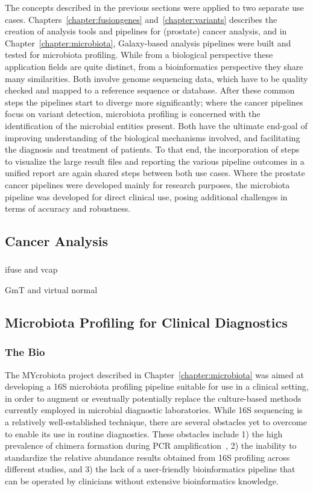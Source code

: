The concepts described in the previous sections were applied to two separate use cases. Chapters~\ref{chapter:fusiongenes} and~\ref{chapter:variants} describes the creation of analysis tools and pipelines for (prostate) cancer analysis, and in Chapter~\ref{chapter:microbiota}, Galaxy-based analysis pipelines were built and tested for microbiota profiling. While from a biological perspective these application fields are quite distinct, from a bioinformatics perspective they share many similarities. Both involve genome sequencing data, which have to be quality checked and mapped to a reference sequence or database. After these common steps the pipelines start to diverge more significantly; where the cancer pipelines focus on variant detection, microbiota profiling is concerned with the identification of the microbial entities present. Both have the ultimate end-goal of improving understanding of the biological mechanisms involved, and facilitating the diagnosis and treatment of patients. To that end, the incorporation of steps to visualize the large result files and reporting the various pipeline outcomes in a unified report are again shared steps between both use cases. Where the prostate cancer pipelines were developed mainly for research purposes, the microbiota pipeline was developed for direct clinical use, posing additional challenges in terms of accuracy and robustness.


\subsection{Cancer Analysis}
\subsubsection{}

ifuse and vcap

GmT and virtual normal


\subsection{Microbiota Profiling for Clinical Diagnostics}
\subsubsection{The Bio}
The MYcrobiota project described in Chapter~\ref{chapter:microbiota} was aimed at developing a 16S microbiota profiling pipeline suitable for use in a clinical setting, in order to augment or eventually potentially replace the culture-based methods currently employed in microbial diagnostic laboratories. While 16S sequencing is a relatively well-established technique, there are several obstacles yet to overcome to enable its use in routine diagnostics. These obstacles include 1) the high prevalence of chimera formation during PCR amplification~\cite{huttenhower2012structure}, 2) the inability to standardize the relative abundance results obtained from 16S profiling across different studies, and 3) the lack of a user-friendly bioinformatics pipeline that can be operated by clinicians without extensive bioinformatics knowledge.

